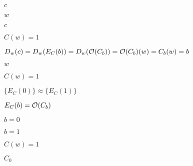 \documentclass[10pt]{book}
\begin{document}
\begin{mdSnippets}
\begin{mdInlineSnippet}[4a8a08f09d37b73795649038408b5f33]
$c$\end{mdInlineSnippet}%
\begin{mdInlineSnippet}[f1290186a5d0b1ceab27f4e77c0c5d68]%
$w$\end{mdInlineSnippet}%
\begin{mdInlineSnippet}[4a8a08f09d37b73795649038408b5f33]%
$c$\end{mdInlineSnippet}%
\begin{mdInlineSnippet}[5f1a8612549aa47d714caf50c4c7f4b2]%
$C(w) = 1$\end{mdInlineSnippet}%
\begin{mdInlineSnippet}[d050fee13f54dc4b0b5ec1a3a7a53363]%
$D_w(c) = D_w(E_C(b)) = D_w(\mathcal{O}(C_b)) = \mathcal{O}(C_b)(w) = C_b(w) = b$\end{mdInlineSnippet}%
\begin{mdInlineSnippet}[f1290186a5d0b1ceab27f4e77c0c5d68]%
$w$\end{mdInlineSnippet}%
\begin{mdInlineSnippet}[5f1a8612549aa47d714caf50c4c7f4b2]%
$C(w) = 1$\end{mdInlineSnippet}%
\begin{mdInlineSnippet}[d47703ea9a6e21f91bec33b1be5fe429]%
$\{ E_C(0) \} \approx \{E_C(1) \}$\end{mdInlineSnippet}%
\begin{mdInlineSnippet}[396a9d1dd9be3b8064ae1890eb3d7bfc]%
$E_C(b) = \mathcal{O}(C_b)$\end{mdInlineSnippet}%
\begin{mdInlineSnippet}[2cd846c62474f70be3291ce24c1bcf6a]%
$b = 0$\end{mdInlineSnippet}%
\begin{mdInlineSnippet}[d8a35c47c0f29d1f868a2769cd3003c5]%
$b = 1$\end{mdInlineSnippet}%
\begin{mdInlineSnippet}[5f1a8612549aa47d714caf50c4c7f4b2]%
$C(w) = 1$\end{mdInlineSnippet}%
\begin{mdInlineSnippet}%
$C_0$\end{mdInlineSnippet}%
\begin{mdInlineSnippet}[4fa71d007c094ac3c858919aec515277]%

\end{mdInlineSnippet}
\end{mdSnippets}
\end{document}
